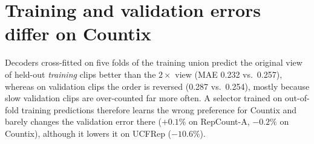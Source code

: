 \section{Training and validation errors differ on Countix}
\label{app:shift}
Decoders cross-fitted on five folds of the training union predict the original
view of held-out \emph{training} clips better than the $2\times$ view (MAE 0.232
vs.\ 0.257), whereas on validation clips the order is reversed (0.287 vs.\
0.254), mostly because slow validation clips are over-counted far more often. A
selector trained on out-of-fold training predictions therefore learns the wrong
preference for Countix and barely changes the validation error there ($+0.1\%$ on
RepCount-A, $-0.2\%$ on Countix), although it lowers it on UCFRep ($-10.6\%$).
